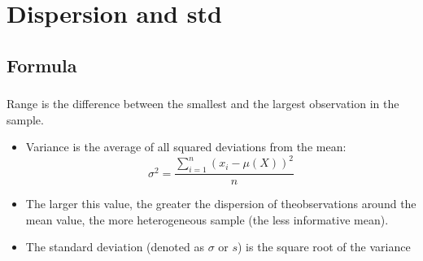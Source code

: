 \documentclass[t, 11pt]{beamer}
\begin{document}
\section{Dispersion and std}
\subsection{Formula}
\begin{frame} 
	\frametitle{\insertsection} 
	\framesubtitle{\insertsubsection}
Range is the difference between the smallest and the largest observation in the sample.	

\begin{itemize}
	\item Variance is the average of all squared deviations from the mean:
	$$\sigma^2 = \frac{\sum^{n}_{i=1} (x_i - \mu(X))^2}{n}$$
 	\item The larger this value, the greater the dispersion of theobservations around the mean value, the more heterogeneous sample (the less informative mean).
 	\item The standard deviation (denoted as $\sigma$ or $s$) is the square root of the variance
\end{itemize}
\end{frame}	

\end{document}
